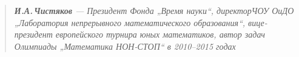 \begin{quote}
\itshape {\bfseries И.А.\,Чистяков} — Президент Фонда „Время науки“, директор\linebreak ЧОУ ОиДО „Лаборатория непрерывного математического образования“, вице-президент европейского турнира юных математиков, автор задач Олимпиады „Математика НОН-СТОП“ в 2010–2015 годах
\end{quote}
